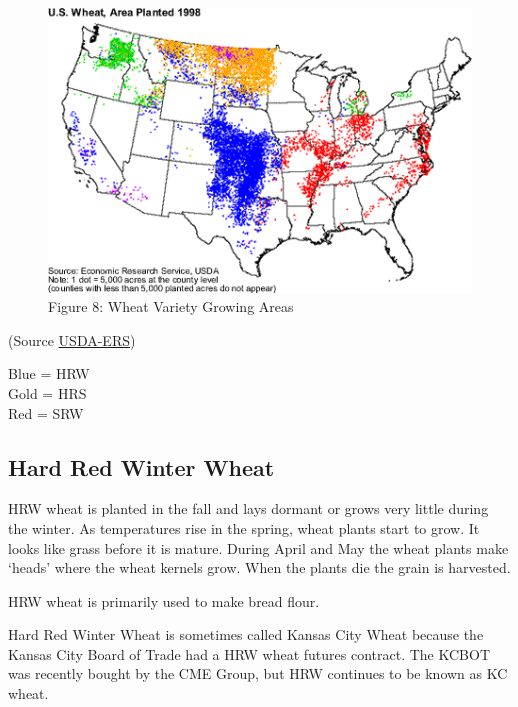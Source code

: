 \documentclass[
  letterpaper,
  DIV=11,
  numbers=noendperiod]{scrreprt}
\begin{document}
\begin{figure}

{\centering \includegraphics{images/Wheat-Growing-Areas.png}

}

\caption{Figure 8: Wheat Variety Growing Areas}

\end{figure}

(Source
\href{https://wayback.archive-it.org/5923/20120310141642/http://ers.usda.gov/Briefing/Wheat/maps.htm}{USDA-ERS})

Blue = HRW\\
Gold = HRS\\
Red = SRW

\hypertarget{hard-red-winter-wheat}{%
\subsection{Hard Red Winter Wheat}\label{hard-red-winter-wheat}}

HRW wheat is planted in the fall and lays dormant or grows very little
during the winter. As temperatures rise in the spring, wheat plants
start to grow. It looks like grass before it is mature. During April and
May the wheat plants make `heads' where the wheat kernels grow. When the
plants die the grain is harvested.

HRW wheat is primarily used to make bread flour.

Hard Red Winter Wheat is sometimes called Kansas City Wheat because the
Kansas City Board of Trade had a HRW wheat futures contract. The KCBOT
was recently bought by the CME Group, but HRW continues to be known as
KC wheat.
\end{document}
